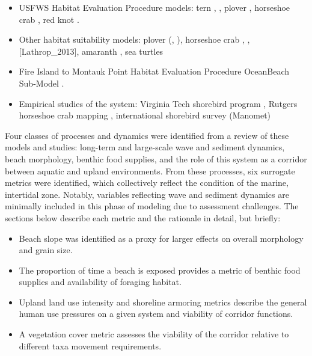 \documentclass[
]{book}
\begin{document}
\begin{itemize}
\item
  USFWS Habitat Evaluation Procedure models: tern \citep{carreker_habitat_1985}, \citep{us_fish_and_wildlife_service_usfws_gulf_2001}, plover \citet{us_fish_and_wildlife_service_usfws_gulf_2001}, horseshoe crab \citet{us_fish_and_wildlife_service_usfws_gulf_2001}, red knot \citet{us_fish_and_wildlife_service_usfws_gulf_2001}.
\item
  Other habitat suitability models: plover (\citet{farmer_habitat_2000}, \citet{seavey_effect_2011}), horseshoe crab \citep{avissar_modeling_2006}, \citep{nancy_jackson_armoring_2010}, {[}Lathrop\_2013{]}, amaranth \citep{sellars_habitat_2007}, sea turtles \citep{dunkin_spatially_2016}\\
\item
  Fire Island to Montauk Point Habitat Evaluation Procedure OceanBeach Sub-Model \citep{usace_evaluation_2009}.\\
\item
  Empirical studies of the system: Virginia Tech shorebird program \citep{herman_unpacking_2019}, Rutgers horseshoe crab mapping \citep{lathrope_mapping_2013}, international shorebird survey (Manomet)
\end{itemize}

Four classes of processes and dynamics were identified from a review of these models and studies: long-term and large-scale wave and sediment dynamics, beach morphology, benthic food supplies, and the role of this system as a corridor between aquatic and upland environments. From these processes, six surrogate metrics were identified, which collectively reflect the condition of the marine, intertidal zone. Notably, variables reflecting wave and sediment dynamics are minimally included in this phase of modeling due to assessment challenges. The sections below describe each metric and the rationale in detail, but briefly:

\begin{itemize}
\item
  Beach slope was identified as a proxy for larger effects on overall morphology and grain size.
\item
  The proportion of time a beach is exposed provides a metric of benthic food supplies and availability of foraging habitat.
\item
  Upland land use intensity and shoreline armoring metrics describe the general human use pressures on a given system and viability of corridor functions.
\item
  A vegetation cover metric assesses the viability of the corridor relative to different taxa movement requirements.
\end{itemize}
\end{document}
